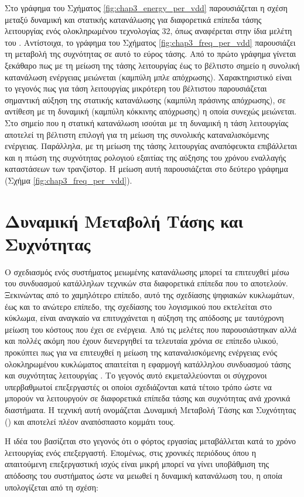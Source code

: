 Στο γράφημα του Σχήματος \ref{fig:chap3_energy_per_vdd} παρουσιάζεται η σχέση μεταξύ δυναμική και στατικής κατανάλωσης για διαφορετικά επίπεδα τάσης λειτουργίας ενός ολοκληρωμένου τεχνολογίας 32\nm, όπως αναφέρεται στην ίδια μελέτη του  \cite{pinckney2012assessing}. Αντίστοιχα, το γράφημα του Σχήματος \ref{fig:chap3_freq_per_vdd} παρουσιάζει τη μεταβολή της συχνότητας σε αυτό το εύρος τάσης. Από το πρώτο γράφημα γίνεται ξεκάθαρο πως με τη μείωση της τάσης λειτουργίας έως το βέλτιστο σημείο η συνολική κατανάλωση ενέργειας μειώνεται (καμπύλη μπλε απόχρωσης). Χαρακτηριστικό είναι το γεγονός πως για τάση λειτουργίας μικρότερη του βέλτιστου παρουσιάζεται σημαντική αύξηση της στατικής κατανάλωσης (καμπύλη πράσινης απόχρωσης), σε αντίθεση με τη δυναμική (καμπύλη κόκκινης απόχρωσης) η οποία συνεχώς μειώνεται. Στο σημείο που η στατική κατανάλωση ισούται με τη δυναμική η τάση λειτουργίας αποτελεί τη βέλτιστη επιλογή για τη μείωση της συνολικής καταναλισκόμενης ενέργειας. Παράλληλα, με τη μείωση της τάσης λειτουργίας αναπόφευκτα επιβάλλεται και η πτώση της συχνότητας ρολογιού εξαιτίας της αύξησης του χρόνου εναλλαγής καταστάσεων των τρανζίστορ. Η μείωση αυτή παρουσιάζεται στο δεύτερο γράφημα (Σχήμα \ref{fig:chap3_freq_per_vdd}).


\section{Δυναμική Μεταβολή Τάσης και Συχνότητας}
\label{chap3_PowerReduction}

Ο σχεδιασμός ενός συστήματος μειωμένης κατανάλωσης μπορεί τα επιτευχθεί μέσω του συνδυασμού κατάλληλων τεχνικών στα διαφορετικά επίπεδα που το αποτελούν. Ξεκινώντας από το χαμηλότερο επίπεδο, αυτό της σχεδίασης ψηφιακών κυκλωμάτων, έως και το ανώτερο επίπεδο, της σχεδίασης του λογισμικού που εκτελείται στο κύκλωμα, είναι αναγκαίο να επιτυγχάνεται η αύξηση της απόδοσης με ταυτόχρονη μείωση του κόστους που έχει σε ενέργεια. Από τις μελέτες που παρουσιάστηκαν αλλά και πολλές ακόμη που έχουν διενεργηθεί τα τελευταία χρόνια σε επίπεδο υλικού, προκύπτει πως για να επιτευχθεί η μείωση της καταναλισκόμενης ενέργειας ενός ολοκληρωμένου κυκλώματος απαιτείται η εφαρμογή κατάλληλου συνδυασμού τάσης και συχνότητας λειτουργίας \cite{zhai2009energy, lorente2014analyzing, de2016near}. Το γεγονός αυτό εκμεταλλεύονται οι σύγχρονοι υπερβαθμωτοί επεξεργαστές οι οποίοι σχεδιάζονται κατά τέτοιο τρόπο ώστε να μπορούν να λειτουργούν σε διαφορετικά επίπεδα τάσης και συχνότητας ανά χρονικά διαστήματα. Η τεχνική αυτή ονομάζεται Δυναμική Μεταβολή Τάσης και Συχνότητας () και αποτελεί πλέον αναπόσπαστο κομμάτι τους.
\par
Η ιδέα του  βασίζεται στο γεγονός ότι ο φόρτος εργασίας μεταβάλλεται κατά το χρόνο λειτουργίας ενός επεξεργαστή. Επομένως, στις χρονικές περιόδους όπου η απαιτούμενη επεξεργαστική ισχύς είναι μικρή μπορεί να γίνει υποβάθμιση της απόδοσης του συστήματος ώστε να μειωθεί η δυναμική κατανάλωση του, η οποία υπολογίζεται από τη σχέση:

